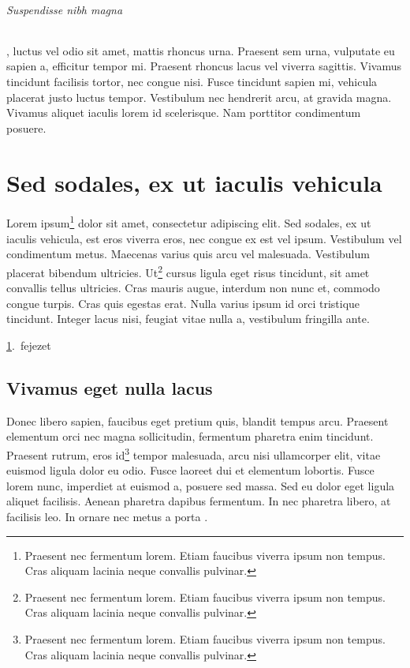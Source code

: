 \documentclass[a4paper,12pt,draft]{report}
\begin{document}
\subparagraph{Suspendisse nibh magna}, luctus vel odio sit amet, mattis rhoncus urna. Praesent sem urna, vulputate eu sapien a, efficitur tempor mi. Praesent rhoncus lacus vel viverra sagittis. Vivamus tincidunt facilisis tortor, nec congue nisi. Fusce tincidunt sapien mi, vehicula placerat justo luctus tempor. Vestibulum nec hendrerit arcu, at gravida magna. Vivamus aliquet iaculis lorem id scelerisque. Nam porttitor condimentum posuere.

\chapter{Sed sodales, ex ut iaculis vehicula}
\label{cha:sed}

Lorem ipsum\footnote{Praesent nec fermentum lorem. Etiam faucibus viverra ipsum non tempus. Cras aliquam lacinia neque convallis pulvinar.} dolor sit amet, consectetur adipiscing elit. Sed sodales, ex ut iaculis vehicula, est eros viverra eros, nec congue ex est vel ipsum. Vestibulum vel condimentum metus. Maecenas varius quis arcu vel malesuada. Vestibulum placerat bibendum ultricies. Ut\footnote{Praesent nec fermentum lorem. Etiam faucibus viverra ipsum non tempus. Cras aliquam lacinia neque convallis pulvinar.} cursus ligula eget risus tincidunt, sit amet convallis tellus ultricies. Cras mauris augue, interdum non nunc et, commodo congue turpis. Cras quis egestas erat. Nulla varius ipsum id orci tristique tincidunt. Integer lacus nisi, feugiat vitae nulla a, vestibulum fringilla ante. \citep{facsko_sw2024}

\ref{cha:sed}.~fejezet

\section{Vivamus eget nulla lacus}

Donec libero sapien, faucibus eget pretium quis, blandit tempus arcu. Praesent elementum orci nec magna sollicitudin, fermentum pharetra enim tincidunt. Praesent rutrum, eros id\footnote{Praesent nec fermentum lorem. Etiam faucibus viverra ipsum non tempus. Cras aliquam lacinia neque convallis pulvinar.} tempor malesuada, arcu nisi ullamcorper elit, vitae euismod ligula dolor eu odio.  Fusce laoreet dui et elementum lobortis. Fusce lorem nunc, imperdiet at euismod a, posuere sed massa. Sed eu dolor eget ligula aliquet facilisis. Aenean pharetra dapibus fermentum. In nec pharetra libero, at facilisis leo. In ornare nec metus a porta \citep[See][and references therein]{facsko2022_ssr}.
\end{document}
